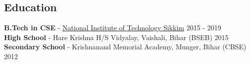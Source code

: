\documentclass[margin, centered]{res}
\begin{document}
    \begin{resume}
        \section{Education}
            \textbf{B.Tech in CSE} -
            \href{https://www.nitsikkim.ac.in/}{National Institute of Technology Sikkim} \hfill 2015 - 2019 \\
            \textbf{High School} - Hare Krishna H/S Vidyalay, Vaishali, Bihar (BSEB) \hfill 2015 \\
            \textbf{Secondary School} - Krishnanand Memorial Academy, Munger, Bihar (CBSE) \hfill 2012


\end{resume}
\end{document}
